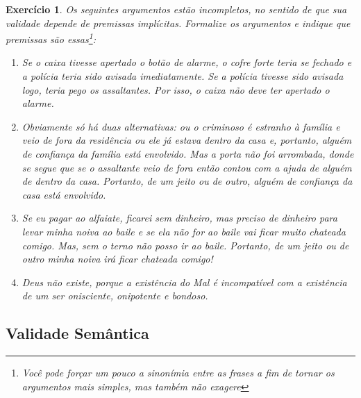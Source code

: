 \documentclass[a4paper,10pt]{article}
\newtheorem{exrcc}{Exercício}[subsection] %
\begin{document}
\begin{exrcc}
 
Os seguintes argumentos estão incompletos, no sentido de que sua validade depende
de premissas implícitas. Formalize os argumentos e indique que premissas são
essas\footnote{Você pode forçar um pouco a sinonímia entre as frases a fim de tornar
os argumentos mais simples, mas também não exagere}:

\begin{enumerate}
 \item Se o caixa tivesse apertado o botão de alarme, o cofre forte teria se
fechado e a polícia teria sido avisada imediatamente. Se a polícia tivesse sido
avisada logo, teria pego os assaltantes. Por isso, o caixa não deve ter apertado o
alarme.
\item Obviamente só há duas alternativas: ou o criminoso é estranho à família e veio de
fora da residência ou ele já estava dentro da casa e, portanto, alguém de confiança
da família está envolvido. Mas a porta não foi arrombada, donde se segue que se o
assaltante veio de fora então contou com a ajuda de alguém de dentro da casa. Portanto,
de um jeito ou de outro, alguém de confiança da casa está envolvido.
\item Se eu pagar ao alfaiate, ficarei sem dinheiro, mas preciso de dinheiro para levar
minha noiva ao baile e se ela não for ao baile vai ficar muito chateada comigo. Mas,
 sem o terno não posso ir ao baile. Portanto, de um jeito ou de outro
minha noiva irá ficar chateada comigo!
\item Deus não existe, porque a existência do Mal é incompatível com a existência de
um ser onisciente, onipotente e bondoso. 
\end{enumerate}
\end{exrcc}

\subsection{Validade Semântica}
\end{document}
